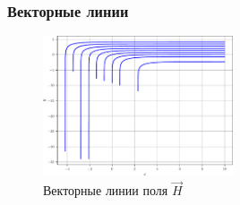 \begin{frame}\frametitle{Векторные линии}
\begin{figure}
    \centering
    \includegraphics[width=0.5\textwidth]{figures/vec_lines.pdf}
    \caption{Векторные линии поля \(\vec H\)}\label{fig:vec_lines}
\end{figure}

\end{frame}
